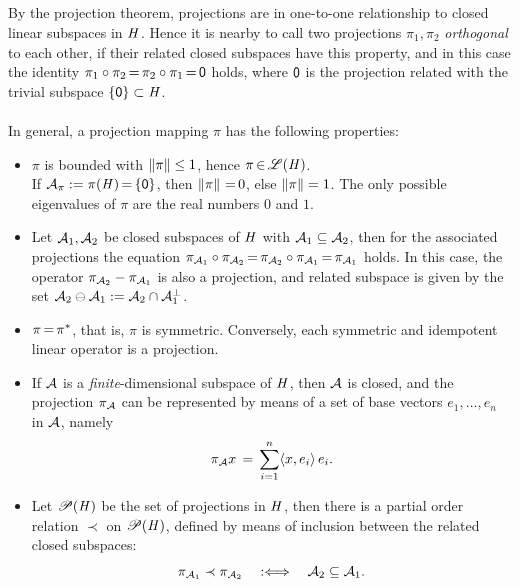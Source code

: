 \documentclass[11pt,twoside]{article}
\begin{document}
\subparagraph{}
By the projection theorem,
projections are in one-to-one relationship to closed linear subspaces in $\mathit{H}$.
Hence it is nearby
to call two projections $\pi_1,\pi_2$ \textit{orthogonal} to each other,
if their related closed subspaces have this property,
and in this case the identity
$\pi_1 \circ \pi_2 {\,=\,} \pi_2 \circ \pi_1 {\,=\,} {\mathsf{0}}$ holds,
where ${\mathsf{0}}$ is the projection related
with the trivial subspace $\{{\mathsf{0}}\} \subset \mathit{H}$.

\paragraph{} %
In general,
a projection mapping $\pi$ has the following properties:

\begin{itemize}[leftmargin=12pt,itemsep=5pt]
\item[1.]
$\pi$ is bounded with $\left\lVert \pi \right\rVert \leq 1$,
hence $\pi {\,\in\,} \mathscr{L}(\mathit{H})$.\\
If $\mathcal{A}_{\pi} := \pi(\mathit{H}) {\,=\,} \{{\mathsf{0}}\}$,
then $\left\lVert \pi \right\rVert {\,=\,} 0$,
else $\left\lVert \pi \right\rVert=1$.
The only possible eigenvalues of $\pi$ are the real numbers $0$ and $1$.

\item[2.]
Let $\mathcal{A}_1,\mathcal{A}_2$ be closed subspaces of $\mathit{H}$
with $\mathcal{A}_1 \subseteq \mathcal{A}_2$,
then for the associated projections the equation
$\pi_{\mathcal{A}_1} \circ \pi_{\mathcal{A}_2} {\,=\,}
 \pi_{\mathcal{A}_2} \circ \pi_{\mathcal{A}_1} {\,=\,} \pi_{\mathcal{A}_1}$
holds.
In this case,
the operator $\pi_{\mathcal{A}_2} - \pi_{\mathcal{A}_1}$ is also a projection,
and related subspace is given by the set
$\mathcal{A}_2 \ominus \mathcal{A}_1 := \mathcal{A}_2 \cap \mathcal{A}_1^{\bot}$.

\item[3.]
$\pi {\,=\,} \pi^{*}$,
that is,
$\pi$ is symmetric.
Conversely,
each symmetric and idempotent linear operator is a projection.

\item[4.]
If $\mathcal{A}$ is a \textit{finite}-dimensional subspace of $\mathit{H}$,
then $\mathcal{A}$ is closed,
and the projection $\pi_{\mathcal{A}}$ can be represented
by means of a set of base vectors $e_1,\ldots,e_n$ in $\mathcal{A}$, namely
\[
\pi_{\mathcal{A}} x \,=\, \sum_{i=1}^n \langle x,e_i \rangle \, e_i.
\]

\item[5.]
Let $\mathscr{P}(\mathit{H})$ be the set of projections in $\mathit{H}$,
then there is a partial order relation $\prec$ on $\mathscr{P}(\mathit{H})$,
defined by means of inclusion between the related closed subspaces:
\[
\pi_{\mathcal{A}_1} \prec \pi_{\mathcal{A}_2} \quad
: \Longleftrightarrow \quad \mathcal{A}_2 \subseteq \mathcal{A}_1.
\]
\end{itemize}
\end{document}
